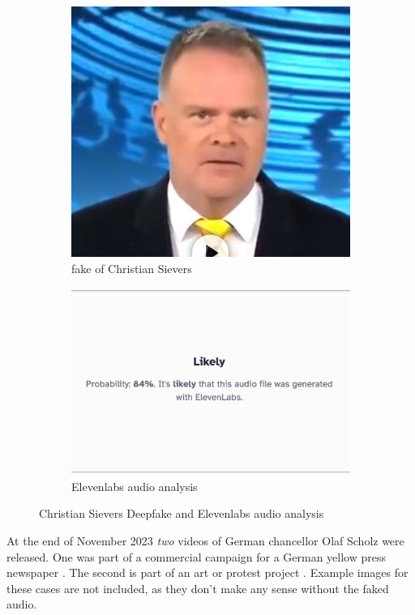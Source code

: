 \documentclass[
  a4paper,  %
  twoside,  %
  bibliography=totoc,
  headsepline,
  cleardoublepage=empty,
  parskip=half,
  draft=false
]{scrbook}
\begin{document}
\begin{figure}[h]
  \centering
  \begin{subfigure}[b]{0.45\textwidth}
    \includegraphics[width=\textwidth]{./graphics/images/sievers.png}
    \caption{fake of Christian Sievers \cite{zdfDeepfakeMitZDFModerator}}
    \label{fig:sievers-fake}
  \end{subfigure}
  \hfill
  \begin{subfigure}[b]{0.5\textwidth}
    \includegraphics[width=\textwidth]{./graphics/images/sievers-11labs.png}
    \caption{Elevenlabs audio analysis \cite{elevenlabsAISpeechClassifier}}
    \label{fig:sievers-11labs}
  \end{subfigure}
  \caption{Christian Sievers Deepfake and Elevenlabs audio analysis}
\end{figure}
At the end of November 2023 \textit{two} videos of German chancellor Olaf Scholz were released. One was part of a commercial campaign for a German yellow press newspaper \cite{dwdl.deSpringerTrommeltMit}. The second is part of an art or protest project \cite{zdfKunstinstallationDeepfakeScholzVerkuendet}. Example images for these cases are not included, as they don't make any sense without the faked audio. 
\end{document}
